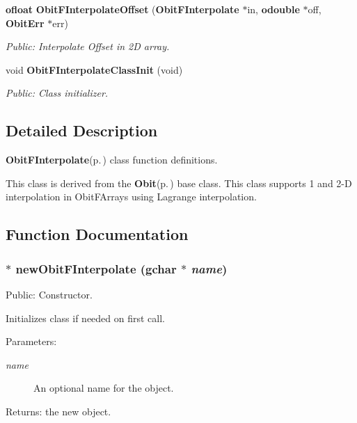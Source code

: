 \begin{CompactItemize}
{\bf ofloat} {\bf Obit\-FInterpolate\-Offset} ({\bf Obit\-FInterpolate} $\ast$in, {\bf odouble} $\ast$off, {\bf Obit\-Err} $\ast$err)
\begin{CompactList}\small\item\em Public: Interpolate Offset in 2D array. \item\end{CompactList}\item 
void {\bf Obit\-FInterpolate\-Class\-Init} (void)
\begin{CompactList}\small\item\em Public: Class initializer. \item\end{CompactList}\end{CompactItemize}


\subsection{Detailed Description}
{\bf Obit\-FInterpolate}{\rm (p.\,\pageref{structObitFInterpolate})} class function definitions. 

This class is derived from the {\bf Obit}{\rm (p.\,\pageref{structObit})} base class. This class supports 1 and 2-D interpolation in Obit\-FArrays using Lagrange interpolation.

\subsection{Function Documentation}
\subsubsection{$\ast$ new\-Obit\-FInterpolate (gchar $\ast$ {\em name})}\label{ObitFInterpolate_8c_a7}


Public: Constructor. 

Initializes class if needed on first call. \begin{Desc}
\item[Parameters:]
\begin{description}
\item[{\em name}]An optional name for the object. \end{description}
\end{Desc}
\begin{Desc}
\item[Returns:]the new object. \end{Desc}
